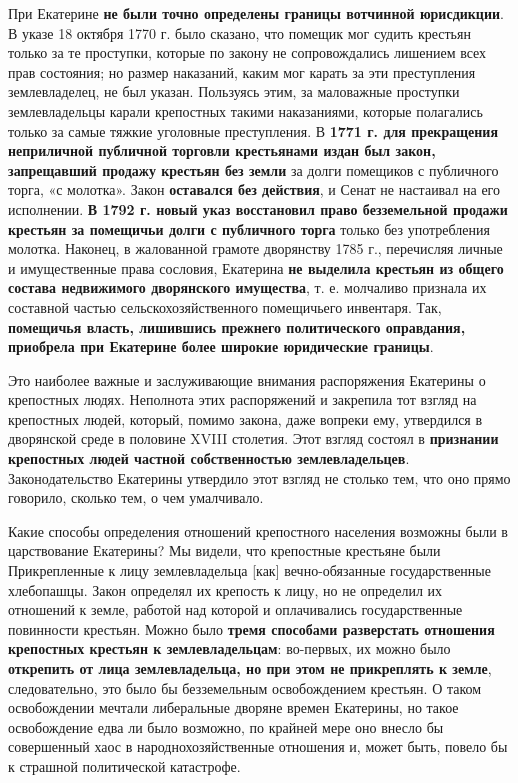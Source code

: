\documentclass{article}
\begin{document}
\hfill

При Екатерине \textbf{не были точно определены границы вотчинной юрисдикции}. В указе 18 октября 1770 г. было сказано, что помещик мог судить крестьян только за те проступки, которые по закону не сопровождались лишением всех прав состояния; но размер наказаний, каким мог карать за эти преступления землевладелец, не был указан. Пользуясь этим, за маловажные проступки землевладельцы карали крепостных такими наказаниями, которые полагались только за самые тяжкие уголовные преступления. В \textbf{1771 г. для прекращения неприличной публичной торговли крестьянами издан был закон, запрещавший продажу крестьян без земли} за долги помещиков с публичного торга, «с молотка». Закон \textbf{оставался без действия}, и Сенат не настаивал на его исполнении. \textbf{В 1792 г. новый указ восстановил право безземельной продажи крестьян за помещичьи долги с публичного торга} только без употребления молотка. Наконец, в жалованной грамоте дворянству 1785 г., перечисляя личные и имущественные права сословия, Екатерина \textbf{не выделила крестьян из общего состава недвижимого дворянского имущества}, т. е. молчаливо признала их составной частью сельскохозяйственного помещичьего инвентаря. Так, \textbf{помещичья власть, лишившись прежнего политического оправдания, приобрела при Екатерине более широкие юридические границы}.

\hfill

Это наиболее важные и заслуживающие внимания распоряжения Екатерины о крепостных людях. Неполнота этих распоряжений и закрепила тот взгляд на крепостных людей, который, помимо закона, даже вопреки ему, утвердился в дворянской среде в половине XVIII столетия. Этот взгляд состоял в \textbf{признании крепостных людей частной собственностью землевладельцев}. Законодательство Екатерины утвердило этот взгляд не столько тем, что оно прямо говорило, сколько тем, о чем умалчивало.

\hfill

Какие способы определения отношений крепостного населения возможны были в царствование Екатерины? Мы видели, что крепостные крестьяне были Прикрепленные к лицу землевладельца [как] вечно-обязанные государственные хлебопашцы. Закон определял их крепость к лицу, но не определил их отношений к земле, работой над которой и оплачивались государственные повинности крестьян. Можно было \textbf{тремя способами разверстать отношения крепостных крестьян к землевладельцам}: во-первых, их можно было \textbf{открепить от лица землевладельца, но при этом не прикреплять к земле}, следовательно, это было бы безземельным освобождением крестьян. О таком освобождении мечтали либеральные дворяне времен Екатерины, но такое освобождение едва ли было возможно, по крайней мере оно внесло бы совершенный хаос в народнохозяйственные отношения и, может быть, повело бы к страшной политической катастрофе.
\end{document}
